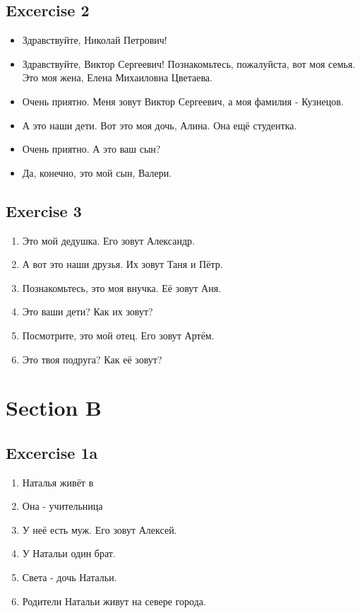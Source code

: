 \documentclass[a4paper, 11pt]{article}
\begin{document}
     \subsection{Excercise 2}
     \begin{itemize}
      \item Здравствуйте, Николай Петрович!
      \item Здравствуйте, Виктор Сергеевич! Познакомьтесь, пожалуйста, вот моя семья. Это моя жена, Елена Михаиловна Цветаева.
      \item Очень приятно. Меня зовут Виктор Сергеевич, а моя фамилия - Кузнецов.
      \item А это наши дети. Вот это моя дочь, Алина. Она ещё студентка.
      \item Очень приятно. А это ваш сын?
      \item Да, конечно, это мой сын, Валери.
     \end{itemize}
     \newpage

     \subsection{Exercise 3}
     \begin{enumerate}
      \item Это мой дедушка. Его зовут Александр.
      \item А вот это наши друзья. Их зовут Таня и Пётр.
      \item Познакомьтесь, это моя внучка. Её зовут Аня.
      \item Это ваши дети? Как их зовут? 
      \item Посмотрите, это мой отец. Его зовут Артём.
      \item Это твоя подруга? Как её зовут?
     \end{enumerate}
     \section{Section B}
     \subsection{Excercise 1a}
     \begin{enumerate}
      \item Наталья живёт в 
      \item Она - учительница
      \item У неё есть муж. Его зовут Алексей.
      \item У Натальи один брат.
      \item Света - дочь Натальи.
      \item Родители Натальи живут на севере города.
     \end{enumerate}
\end{document}

